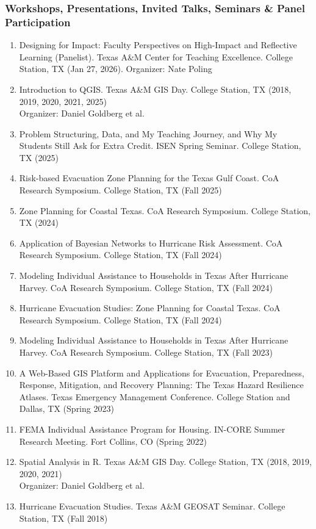 \documentclass[11pt,oneside]{article}
\begin{document}
\subsubsection{Workshops, Presentations, Invited Talks, Seminars \& Panel Participation}
\begin{enumerate}[leftmargin=40pt]
\item Designing for Impact: Faculty Perspectives on High-Impact and Reflective Learning (Panelist). Texas A\&M Center for Teaching Excellence. College Station, TX (Jan 27, 2026). Organizer: Nate Poling
\item {Introduction to QGIS. Texas A\&M GIS Day.} College Station, TX (2018, 2019, 2020, 2021, 2025)\\
      Organizer: Daniel Goldberg et al.
\item Problem Structuring, Data, and My Teaching Journey, and Why My Students Still Ask for Extra Credit. ISEN Spring Seminar. College Station, TX (2025)
\item {Risk-based Evacuation Zone Planning for the Texas Gulf Coast.} CoA Research Symposium. College Station, TX (Fall 2025)
\item Zone Planning for Coastal Texas. CoA Research Symposium. College Station, TX (2024) %
\item Application of Bayesian Networks to Hurricane Risk Assessment. CoA Research Symposium. College Station, TX (Fall 2024)
\item Modeling Individual Assistance to Households ​in Texas After Hurricane Harvey. CoA Research Symposium. College Station, TX (Fall 2024)
\item Hurricane Evacuation Studies: Zone Planning for Coastal Texas. CoA Research Symposium. College Station, TX (Fall 2024)
\item Modeling Individual Assistance to Households ​in Texas After Hurricane Harvey. CoA Research Symposium. College Station, TX (Fall 2023)
\item A Web-Based GIS Platform and Applications for Evacuation, Preparedness, Response, Mitigation, and Recovery Planning: The Texas Hazard Resilience Atlases. Texas Emergency Management Conference. College Station and Dallas, TX (Spring 2023)
\item FEMA Individual Assistance Program for Housing. IN-CORE Summer Research Meeting. Fort Collins, CO (Spring 2022)
\item Spatial Analysis in R. Texas A\&M GIS Day. College Station, TX (2018, 2019, 2020, 2021)\\
      Organizer: Daniel Goldberg et al.
\item Hurricane Evacuation Studies. Texas A\&M GEOSAT Seminar. College Station, TX (Fall 2018)

\end{enumerate}
\end{document}
